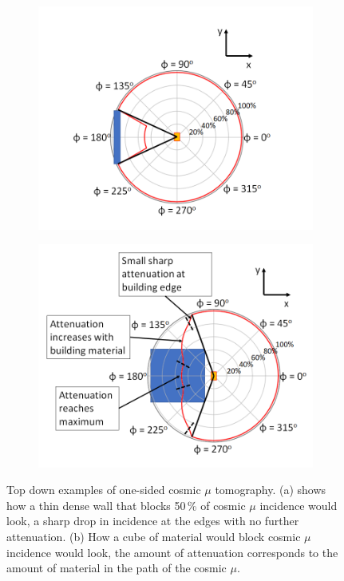  \begin{figure}[!h]
\centering
\begin{subfigure}{.5\textwidth}
  \centering
  \includegraphics[width=\linewidth]{Chapter5/Figs/topDownWallPhiRedo.png}
  \captionsetup{width=.9\linewidth}
  \caption{}
  \label{subFig:TopDownCircularWallPlot}
\end{subfigure}%
\begin{subfigure}{.5\textwidth}
  \centering
\includegraphics[width=\linewidth]{Chapter5/Figs/topDownCubePhiRedo.png}
  \captionsetup{width=.9\linewidth}
  \caption{}
  \label{subFig:TopDownCircularCubePlot}
\end{subfigure}
\caption{Top down examples of one-sided cosmic $\mu$ tomography. (a) shows how a thin dense wall that blocks 50\,\% of cosmic $\mu$ incidence would look, a sharp drop in incidence at the edges with no further attenuation. (b) How a cube of material would block cosmic $\mu$ incidence would look, the amount of attenuation corresponds to the amount of material in the path of the cosmic $\mu$.}
\label{fig:TopDownCircularWallCubePlot}
\end{figure}
 
